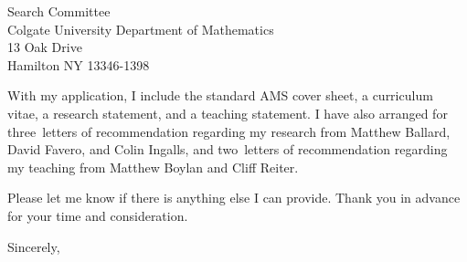 \documentclass[10pt]{letter}
\def\materials{the standard AMS cover sheet,
  a curriculum vitae,
  a research statement,
  and a teaching statement}
\def\numresrefs{three}
\def\numteachrefs{two}
\def\refs{Matthew Ballard,
  David Favero,
  and Colin Ingalls}
\def\teachingrefs{Matthew Boylan and Cliff Reiter}
\begin{document}
\begin{letter}{
    Search Committee\\
    Colgate University Department of Mathematics\\
    13 Oak Drive\\
    Hamilton NY 13346-1398
  }
  
  
  With my application, I include \materials.
  I have also arranged for \numresrefs\  letters of recommendation regarding my research from \refs, and \numteachrefs\ letters of recommendation regarding my teaching from \teachingrefs.

  
  Please let me know if there is anything else I can provide.
  Thank you in advance for your time and consideration.
  \closing{Sincerely,}
\end{letter}
\end{document}
